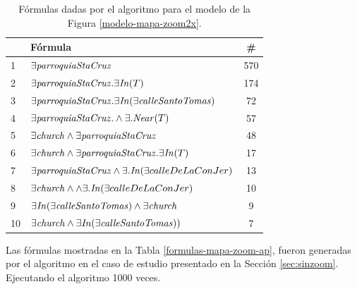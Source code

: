 \begin{table}[h]
\begin{center}
\begin{tabular}{|l|l|c|}
\hline
&F\'ormula                           &  \# \\ \hline \hline
1& $\exists \mathit{parroquiaStaCruz}$& 570\\ \hline

2& $\exists \mathit{parroquiaStaCruz}. \exists \mathit{In}(T)$& 174\\ \hline
3& $\exists \mathit{parroquiaStaCruz}. \exists \mathit{In}(\exists \mathit{calleSantoTomas})$& 72\\ \hline
4& $\exists \mathit{parroquiaStaCruz}. \land \exists.\mathit{Near}(T)$& 57\\ \hline

5& $\exists \mathit{church} \land \exists \mathit{parroquiaStaCruz}$& 48\\ \hline
6& $\exists \mathit{church} \land \exists \mathit{parroquiaStaCruz}. \exists \mathit{In}(T)$& 17\\ \hline
7& $\exists \mathit{parroquiaStaCruz} \land \exists. \mathit{In}(\exists calleDeLaConJer)$& 13\\ \hline
8& $\exists \mathit{church} \land \land \exists. \mathit{In}(\exists calleDeLaConJer) $&10\\ \hline

9& $\exists \mathit{In}(\exists \mathit{calleSantoTomas}) \land \exists \mathit{church}$&9\\ \hline

10& $\exists \mathit{church} \land \exists \mathit{In}(\exists \mathit{calleSantoTomas}))$&7\\ \hline


\end{tabular}

\caption{F\'ormulas dadas por el algoritmo para el modelo de la Figura \protect\ref{modelo-mapa-zoom2x}.}\label{formulas-mapa-zoom2x-apendice}
\end{center}
\end{table}


Las f\'ormulas mostradas en la Tabla \ref{formulas-mapa-zoom-ap}, fueron generadas por el algoritmo en el caso de estudio presentado en la Secci\'on \ref{sec:sinzoom}. Ejecutando el algoritmo 1000 veces.

